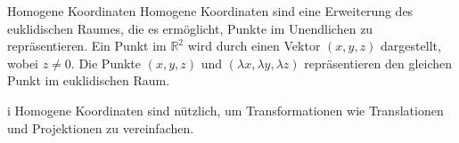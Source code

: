 \begin{definition}{Homogene Koordinaten}
    Homogene Koordinaten sind eine Erweiterung des euklidischen Raumes, die es ermöglicht, Punkte im Unendlichen zu repräsentieren.
    Ein Punkt im $\mathbb{R}^2$ wird durch einen Vektor $(x, y, z)$ dargestellt, wobei $z\neq 0$.
    Die Punkte $(x, y, z)$ und $(\lambda x, \lambda y, \lambda z)$ repräsentieren den gleichen Punkt im euklidischen Raum.
    \begin{highlight}{i}
        Homogene Koordinaten sind nützlich, um Transformationen wie Translationen und Projektionen zu vereinfachen.
    \end{highlight}
    
\end{definition}